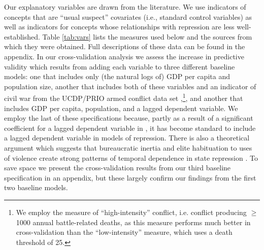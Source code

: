\documentclass[12pt]{article}
\begin{document}
Our explanatory variables are drawn from the literature. We use indicators of concepts that are ``usual suspect'' covariates (i.e., standard control variables) as well as indicators for concepts whose relationships with repression are less well-established. Table \ref{tab:vars} lists the measures used below and the sources from which they were obtained. Full descriptions of these data can be found in the appendix. In our cross-validation analysis we assess the increase in predictive validity which results from adding each variable to three different baseline models: one that includes only (the natural logs of) GDP per capita and population size, another that includes both of these variables and an indicator of civil war from the UCDP/PRIO armed conflict data set \citep{ThemnerWallensteen2012},\footnote{We employ the measure of ``high-intensity'' conflict, i.e. conflict producing $\geq$ 1000 annual battle-related deaths, as this measure performs much better in cross-validation than the ``low-intensity'' measure, which uses a death threshold of 25.}, and another that includes GDP per capita, population, and a lagged dependent variable. We employ the last of these specifications because, partly as a result of a significant coefficient for a lagged dependent variable in \citet{PoeTate1994}, it has become standard to include a lagged dependent variable in models of repression. There is also a theoretical argument which suggests that bureaucratic inertia and elite habituation to uses of violence create strong patterns of temporal dependence  in state repression \citep[E.g.,]{Gurr1988,Davenport2007}. To save space we present the cross-validation results from our third baseline specification in an appendix, but these largely confirm our findings from the first two baseline models. 
\end{document}
